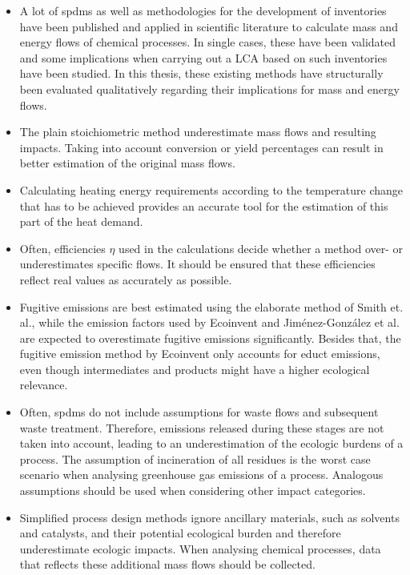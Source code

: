 \begin{itemize}
    \item A lot of \aclp{spdm} as well as methodologies for the development of inventories have been published and applied in scientific literature to calculate mass and energy flows of chemical processes. In single cases, these have been validated and some implications when carrying out a LCA based on such inventories have been studied. In this thesis, these existing methods have structurally been evaluated qualitatively regarding their implications for mass and energy flows.
    \item The plain stoichiometric method underestimate mass flows and resulting impacts. Taking into account conversion or yield percentages can result in better estimation of the original mass flows.
    \item Calculating heating energy requirements according to the temperature change that has to be achieved provides an accurate tool for the estimation of this part of the heat demand. 
    \item Often, efficiencies $\eta$ used in the calculations decide whether a method over- or underestimates specific flows. It should be ensured that these efficiencies reflect real values as accurately as possible. 
    \item Fugitive emissions are best estimated using the elaborate method of Smith et. al., while the emission factors used by Ecoinvent and Jiménez-González et al. are expected to overestimate fugitive emissions significantly. Besides that, the fugitive emission method by Ecoinvent only accounts for educt emissions, even though intermediates and products
    might have a higher ecological relevance.%
    \item Often, \aclp{spdm} do not include assumptions for waste flows and subsequent waste treatment. Therefore, emissions released during these stages are not taken into account, leading to an underestimation of the ecologic burdens of a process. The assumption of incineration of all residues is the worst case scenario when analysing greenhouse gas emissions of a process. Analogous assumptions should be used when considering other impact categories.  
    \item Simplified process design methods ignore ancillary materials, such as solvents and catalysts, and their potential ecological burden and therefore underestimate ecologic impacts. When analysing chemical processes, data that reflects these additional mass flows should be collected. 

\end{itemize}
